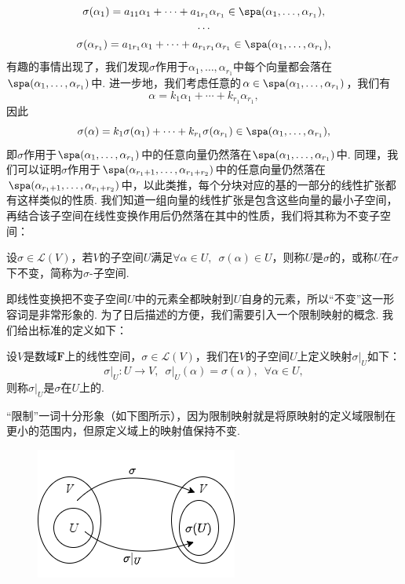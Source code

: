 \begin{gather*}
    \sigma(\alpha_1)=a_{11}\alpha_1+\cdots+a_{1r_1}\alpha_{r_1}\in \spa(\alpha_1,\ldots,\alpha_{r_1}),\\
    \cdots\\
    \sigma(\alpha_{r_1})=a_{1r_1}\alpha_1+\cdots+a_{r_1r_1}\alpha_{r_1}\in \spa(\alpha_1,\ldots,\alpha_{r_1}),
\end{gather*}
有趣的事情出现了，我们发现$\sigma$作用于$\alpha_1,\ldots,\alpha_{r_1}$中每个向量都会落在$\spa(\alpha_1,\ldots,\alpha_{r_1})$中. 进一步地，我们考虑任意的$\alpha\in\spa(\alpha_1,\ldots,\alpha_{r_1})$，我们有
\[\alpha=k_1\alpha_1+\cdots+k_{r_1}\alpha_{r_1},\]
因此
\[\sigma(\alpha)=k_1\sigma(\alpha_1)+\cdots+k_{r_1}\sigma(\alpha_{r_1})\in \spa(\alpha_1,\ldots,\alpha_{r_1}),\]
即$\sigma$作用于$\spa(\alpha_1,\ldots,\alpha_{r_1})$中的任意向量仍然落在$\spa(\alpha_1,\ldots,\alpha_{r_1})$中. 同理，我们可以证明$\sigma$作用于$\spa(\alpha_{r_1+1},\ldots,\alpha_{r_1+r_2})$中的任意向量仍然落在$\spa(\alpha_{r_1+1},\ldots,\alpha_{r_1+r_2})$中，以此类推，每个分块对应的基的一部分的线性扩张都有这样类似的性质. 我们知道一组向量的线性扩张是包含这些向量的最小子空间，再结合该子空间在线性变换作用后仍然落在其中的性质，我们将其称为不变子空间：
\begin{definition}{}{}
    设$\sigma\in \mathcal{L}(V)$，若$V$的子空间$U$满足$\forall \alpha\in U,\enspace \sigma(\alpha)\in U$，则称$U$是$\sigma$的，或称$U$在$\sigma$下不变，简称为$\sigma$-子空间.
\end{definition}

即线性变换把不变子空间$U$中的元素全都映射到$U$自身的元素，所以``不变''这一形容词是非常形象的. 为了日后描述的方便，我们需要引入一个限制映射的概念. 我们给出标准的定义如下：
\begin{definition}{}{} 
    设$V$是数域$\mathbf{F}$上的线性空间，$\sigma\in\mathcal{L}(V)$，我们在$V$的子空间$U$上定义映射$\sigma\vert_U$如下：
    \[\sigma\vert_U:U\to V,\enspace\sigma\vert_U(\alpha)=\sigma(\alpha),\enspace\forall \alpha\in U,\]
    则称$\sigma\vert_U$是$\sigma$在$U$上的.
\end{definition}

``限制''一词十分形象（如下图所示），因为限制映射就是将原映射的定义域限制在更小的范围内，但原定义域上的映射值保持不变.
\begin{figure}[H]
    \centering
    \includegraphics[scale=0.7]{figs/18-1.png}
\end{figure}

